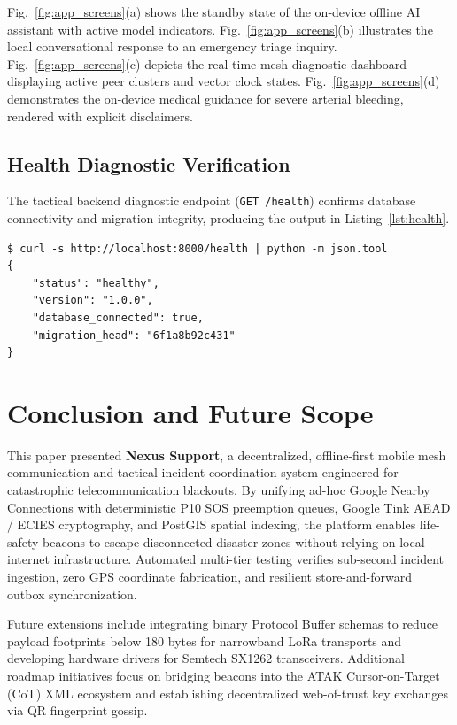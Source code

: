 \documentclass[conference,a4paper]{IEEEtran}
\begin{document}
Fig.~\ref{fig:app_screens}(a) shows the standby state of the on-device offline AI assistant with active model indicators. Fig.~\ref{fig:app_screens}(b) illustrates the local conversational response to an emergency triage inquiry. Fig.~\ref{fig:app_screens}(c) depicts the real-time mesh diagnostic dashboard displaying active peer clusters and vector clock states. Fig.~\ref{fig:app_screens}(d) demonstrates the on-device medical guidance for severe arterial bleeding, rendered with explicit disclaimers.

\subsection{Health Diagnostic Verification}
The tactical backend diagnostic endpoint (\texttt{GET /health}) confirms database connectivity and migration integrity, producing the output in Listing~\ref{lst:health}.

\begin{lstlisting}[language={},caption={Execution Output -- Health Diagnostic Endpoint},label={lst:health}]
$ curl -s http://localhost:8000/health | python -m json.tool
{
    "status": "healthy",
    "version": "1.0.0",
    "database_connected": true,
    "migration_head": "6f1a8b92c431"
}
\end{lstlisting}

\section{Conclusion and Future Scope}
\balance
This paper presented \textbf{Nexus Support}, a decentralized, offline-first mobile mesh communication and tactical incident coordination system engineered for catastrophic telecommunication blackouts. By unifying ad-hoc Google Nearby Connections with deterministic P10 SOS preemption queues, Google Tink AEAD / ECIES cryptography, and PostGIS spatial indexing, the platform enables life-safety beacons to escape disconnected disaster zones without relying on local internet infrastructure. Automated multi-tier testing verifies sub-second incident ingestion, zero GPS coordinate fabrication, and resilient store-and-forward outbox synchronization.

Future extensions include integrating binary Protocol Buffer schemas to reduce payload footprints below 180 bytes for narrowband LoRa transports and developing hardware drivers for Semtech SX1262 transceivers. Additional roadmap initiatives focus on bridging beacons into the ATAK Cursor-on-Target (CoT) XML ecosystem and establishing decentralized web-of-trust key exchanges via QR fingerprint gossip.
\end{document}
